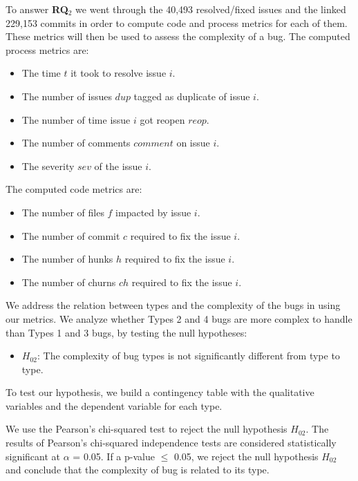 To answer \textbf{RQ\(_2\)} we went through the 40,493 resolved/fixed
issues and the linked 229,153 commits in order to compute code and
process metrics for each of them. These metrics will then be used to
assess the complexity of a bug. The computed process metrics are:

\begin{itemize}
\tightlist
\item
  The time \(t\) it took to resolve issue \(i\).
\item
  The number of issues \(dup\) tagged as duplicate of issue \(i\).
\item
  The number of time issue \(i\) got reopen \(reop\).
\item
  The number of comments \(comment\) on issue \(i\).
\item
  The severity \(sev\) of the issue \(i\).
\end{itemize}

The computed code metrics are:

\begin{itemize}
\tightlist
\item
  The number of files \(f\) impacted by issue \(i\).
\item
  The number of commit \(c\) required to fix the issue \(i\).
\item
  The number of hunks \(h\) required to fix the issue \(i\).
\item
  The number of churns \(ch\) required to fix the issue \(i\).
\end{itemize}

We address the relation between types and the complexity of the bugs in
using our metrics. We analyze whether Types 2 and 4 bugs are more
complex to handle than Types 1 and 3 bugs, by testing the null
hypotheses:

\begin{itemize}
\tightlist
\item
  \(H_{02}\): The complexity of bug types is not significantly different
  from type to type.
\end{itemize}

To test our hypothesis, we build a contingency table with the
qualitative variables and the dependent variable for each type.

We use the Pearson's chi-squared test to reject the null hypothesis
\(H_{02}\). The results of Pearson's chi-squared independence tests are
considered statistically significant at \(\alpha\) = 0.05. If a p-value
\(\le\) 0.05, we reject the null hypothesis \(H_{02}\) and conclude that
the complexity of bug is related to its type.


